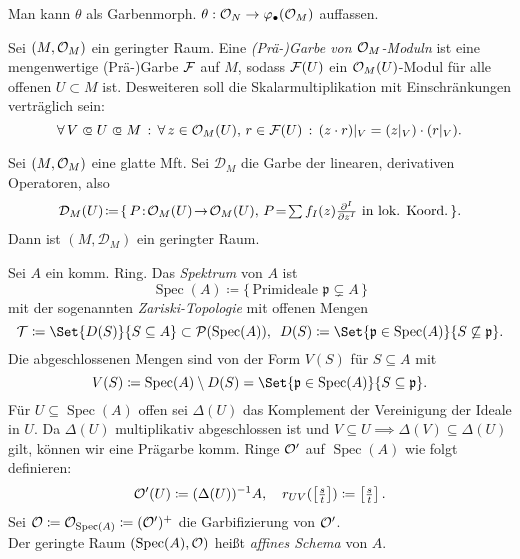 \documentclass{cheat-sheet}
\newcommand{\Tau}{\mathcal{T}} %
\DeclareMathOperator{\Spec}{Spec} %
\newcommand{\Pow}{\mathcal{P}} %
\begin{document}

\begin{bem}
  Man kann $\theta$ als Garbenmorph. $\theta : \mathcal{O}_N \to \varphi_\bullet(\mathcal{O}_M)$ auffassen.
\end{bem}

\begin{defn}
  Sei $(M, \mathcal{O}_M)$ ein geringter Raum. Eine \emph{(Prä-)Garbe von $\mathcal{O}_M$-Moduln} ist eine mengenwertige (Prä-)Garbe $\mathcal{F}$ auf $M$, sodass $\mathcal{F}(U)$ ein $\mathcal{O}_M(U)$-Modul für alle offenen $U \subset M$ ist. Desweiteren soll die Skalarmultiplikation mit Einschränkungen verträglich sein:
  \[ \fa{V \opn U \opn M} \fa{z \in \O_M(U), \, r \in \Fais(U)} (z \cdot r)|_V = (z|_V) \cdot (r|_V). \]
\end{defn}

\begin{bsp}
  Sei $(M, \mathcal{O}_M)$ eine glatte Mft. Sei $\mathcal{D}_M$ die Garbe der linearen, derivativen Operatoren, also
  \[ \mathcal{D}_M(U) \!\coloneqq\! \{ \, P \!:\! \O_M(U) \!\to\! \O_M(U), \, P \!=\! \sum f_I(z) \tfrac{\partial^I}{\partial z^I} \text{ in lok. Koord.} \, \}. \]
  Dann ist $(M, \mathcal{D}_M)$ ein geringter Raum. %
\end{bsp}



\begin{defn}
  Sei $A$ ein komm. Ring. Das \emph{Spektrum} von $A$ ist
  \[ \Spec(A) \coloneqq \{ \, \text{Primideale $\mathfrak{p} \subsetneq A$} \, \} \]
  mit der sogenannten \emph{Zariski-Topologie} mit offenen Mengen
  \[
    \Tau \coloneqq \Set{D(S)}{S \subseteq A} \subset \Pow(\Spec(A)), \enspace
    D(S) \coloneqq \Set{\mathfrak{p} \in \Spec(A)}{S \not\subseteq \mathfrak{p}}.
  \]
  Die abgeschlossenen Mengen sind von der Form $V(S)$ für $S \subseteq A$ mit
  \[
    V(S) \coloneqq \Spec(A) \setminus D(S) = \Set{\mathfrak{p} \in \Spec(A)}{S \subseteq \mathfrak{p}}.
  \]
  Für $U \subseteq \Spec(A)$ offen sei $\Delta(U)$ das Komplement der Vereinigung der Ideale in $U$.
  Da $\Delta(U)$ multiplikativ abgeschlossen ist und $V \subseteq U \!\implies\! \Delta(V) \subseteq \Delta(U)$ gilt, können wir eine Prägarbe komm. Ringe $\mathcal{O}'$ auf $\Spec(A)$ wie folgt definieren:
  \[
    \mathcal{O}'(U) \coloneqq (\Delta(U))^{-1} A, \quad
    r_{UV}(\left[\tfrac{s}{t}\right]) \coloneqq \left[\tfrac{s}{t}\right].
  \]
  Sei $\O \coloneqq \O_{\Spec(A)} \coloneqq (\O')^+$ die Garbifizierung von $\mathcal{O}'$. \\
  Der geringte Raum $(\Spec(A), \O)$ heißt \emph{affines Schema} von $A$.
\end{defn}
\end{document}
